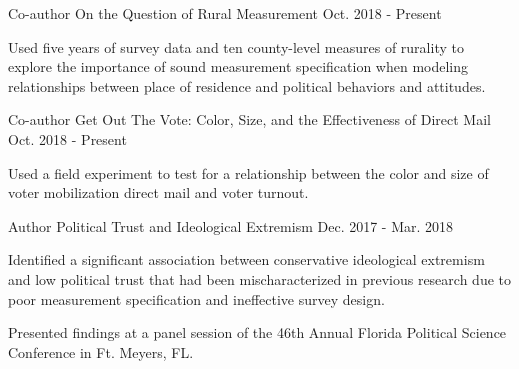 \begin{cventries}
    \cventry
      {Co-author} %
      {On the Question of Rural Measurement} %
      {Oct. 2018 - Present} %
      {} %
      {
        \begin{cvitems} %
          \item {Used five years of survey data and ten county-level measures of rurality to explore the importance of sound measurement specification when modeling relationships between place of residence and political behaviors and attitudes.}
        \end{cvitems}
      }

    \cventry
      {Co-author} %
      {Get Out The Vote: Color, Size, and the Effectiveness of Direct Mail} %
      {Oct. 2018 - Present} %
      {} %
      {
        \begin{cvitems} %
          \item {Used a field experiment to test for a relationship between the color and size of voter mobilization direct mail and voter turnout.}
        \end{cvitems}
      }


    \cventry
      {Author} %
      {Political Trust and Ideological Extremism} %
      {Dec. 2017 - Mar. 2018} %
      {} %
      {
        \begin{cvitems} %
          \item {Identified a significant association between conservative ideological extremism and low political trust that had been mischaracterized in previous research due to poor measurement specification and ineffective survey design.}
          \item {Presented findings at a panel session of the 46th Annual Florida Political Science Conference in Ft. Meyers, FL.}
        \end{cvitems}
      }

\end{cventries}
